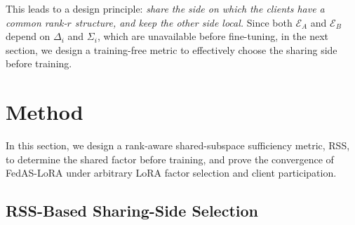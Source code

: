 \documentclass[lettersize,journal]{IEEEtran}
\begin{document}
	This leads to a design principle: \textit{share the side on which the clients have a common rank-$r$ structure, and keep the other side local.} 
	Since both $\mathcal{E}_A$ and $\mathcal{E}_B$ depend on $\Delta_i$ and $\Sigma_i$, which are unavailable before fine-tuning, in the next section, we design a training-free metric to effectively choose the sharing side before training.
	
	
	
	
	\section{Method}
	\label{sec:method}
	
	In this section, we design a rank-aware shared-subspace sufficiency metric, RSS, to determine the shared factor before training, and prove the convergence of FedAS-LoRA under arbitrary LoRA factor selection and client participation.
	
	
	\subsection{RSS-Based Sharing-Side Selection}
	\label{subsec:srios_selection}
	
\end{document}
